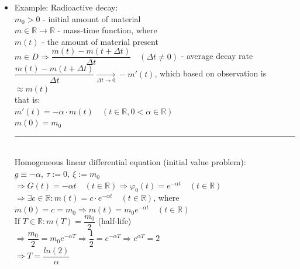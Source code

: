 \documentclass[margin=0px]{article}
\newcommand{\R}{\mathbb{R}}
\begin{document}
\begin{description}
\begin{itemize}
                  $M := \{ \varphi : I \rightarrow \R : \varphi'(t) = g(t)\cdot\varphi(t) + h(t) \ (t \in I)\} $ \\
                  $M_h := \{ \varphi : I \rightarrow \R : \varphi'(t) = g(t)\cdot\varphi(t) \ (t \in I)\} $\\
                  $\Rightarrow \forall \psi \in M : M = \psi + M_h = \{\varphi + \psi : \varphi \in M_h\}$\\
                  (And here $\psi$, based on the above, can be written in the form $m\cdot\varphi_0$)
            \item Example: Radioactive decay: \\
                  $ m_0 > 0$ - initial amount of material \\
                  $ m \in \R \rightarrow \R $ - mass-time function, where \\
                  $m(t)$ - the amount of material present \\
                  $ m \in D \Rightarrow \dfrac{m(t) - m(t+\Delta t)}{\Delta t} \quad (\Delta t \neq 0) $ - average decay rate \\
                  $ \dfrac{m(t) - m(t+\Delta t)}{\Delta t} \xrightarrow[\Delta t \rightarrow 0]{} -m'(t) $, which based on observation is $ \approx m(t)$ \\

                  that is: \\
                  $ m'(t) = - \alpha \cdot m(t) \quad (t\in\R, 0 < \alpha \in \R)$\\
                  $ m(0) = m_0 $ \\
                  \rule{3cm}{0.2pt} \\
                  Homogeneous linear differential equation (initial value problem): \\
                  $ g \equiv -\alpha, \ \tau :=0, \ \xi := m_0 $ \\
                  $ \Rightarrow G(t) = -\alpha t \quad (t\in\R) \Rightarrow \varphi_0(t) = e^{-\alpha t} \quad (t \in \R)$ \\
                  $ \Rightarrow \exists c \in \R : m(t) = c\cdot e^{-\alpha t} \quad (t \in \R)$, where \\
                  $m(0) = c = m_0 \Longrightarrow m(t) = m_0e^{-\alpha t} \quad (t \in \R)$ \\
                  If $ T \in \R : m(T) = \dfrac{m_0}{2} $ (half-life) \\
                  $\Rightarrow \dfrac{m_0}{2} = m_0e^{-\alpha T} \Rightarrow \dfrac{1}{2} = e^{-\alpha T} \Rightarrow e^{\alpha T} = 2$ \\
                  $\Rightarrow T = \dfrac{ln(2)}{\alpha} $
        \end{itemize}
\end{description}
\end{document}
